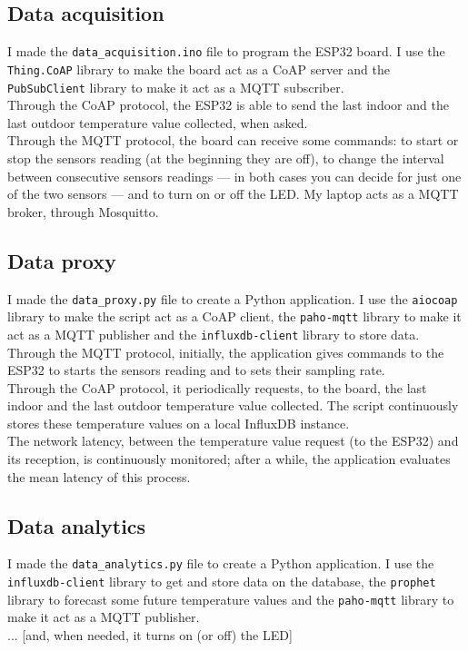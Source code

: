 \documentclass[conference]{IEEEtran}
\begin{document}
\subsection{Data acquisition}
I made the \texttt{data\_acquisition.ino} file to program the ESP32 board. I use the \texttt{Thing.CoAP} library to make the board act as a CoAP server and the \texttt{PubSubClient} library to make it act as a MQTT subscriber.\\
Through the CoAP protocol, the ESP32 is able to send the last indoor and the last outdoor temperature value collected, when asked.\\
Through the MQTT protocol, the board can receive some commands: to start or stop the sensors reading (at the beginning they are off), to change the interval between consecutive sensors readings --- in both cases you can decide for just one of the two sensors --- and to turn on or off the LED. My laptop acts as a MQTT broker, through Mosquitto.

\subsection{Data proxy}
I made the \texttt{data\_proxy.py} file to create a Python application. I use the \texttt{aiocoap} library to make the script act as a CoAP client, the \texttt{paho-mqtt} library to make it act as a MQTT publisher and the \texttt{influxdb-client} library to store data.\\
Through the MQTT protocol, initially, the application gives commands to the ESP32 to starts the sensors reading and to sets their sampling rate.\\
Through the CoAP protocol, it periodically requests, to the board, the last indoor and the last outdoor temperature value collected. The script continuously stores these temperature values on a local InfluxDB instance.\\
The network latency, between the temperature value request (to the ESP32) and its reception, is continuously monitored; after a while, the application evaluates the mean latency of this process.

\subsection{Data analytics}
I made the \texttt{data\_analytics.py} file to create a Python application. I use the \texttt{influxdb-client} library to get and store data on the database, the \texttt{prophet} library to forecast some future temperature values and the \texttt{paho-mqtt} library to make it act as a MQTT publisher.\\
...
[and, when needed, it turns on (or off) the LED]
\end{document}
